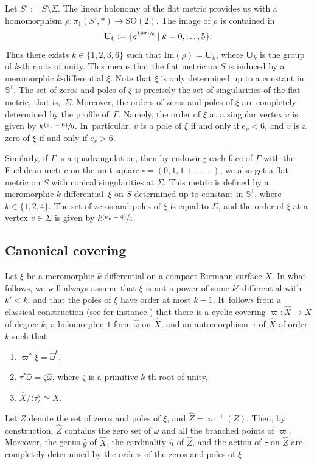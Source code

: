 \documentclass[JEP,XML,SOM,Unicode]{cedram}
\newenvironment{enumeratea}
{\bgroup\def\theenumi{\alph{enumi}}\begin{enumerate}}
{\end{enumerate}\egroup}
\newcommand{\psfrac}[2]{\sfrac{(#1)}{#2}}
\theoremstyle{plain}
\theoremstyle{definition}
\renewcommand{\S}{\mathbb{S}}
\newcommand{\Ub}{\mathbf{U}}
\let\Sig\Sigma
\let\G\Gamma
\begin{document}
Let $S':=S\setminus\Sigma$. The linear holonomy of the flat metric provides us with a homomorphism $\rho: \pi_1(S',*) \to \mathrm{SO}(2)$.
The image of $\rho$ is contained in
\[
\Ub_6:=\{e^{k\sfrac{2\pi\imath}{6}}\mid k=0,\dots,5\}.
\]
Thus there exists $k\in \{1,2,3,6\}$ such that $\mathrm{Im}(\rho)=\Ub_k$, where $\Ub_k$ is the group of $k$-th roots of unity.
This means that the flat metric on $S$ is induced by a meromorphic $k$-differential $\xi$.
Note that $\xi$ is only determined up to a constant in $\S^1$.
The set of zeros and poles of $\xi$ is precisely the set of singularities of the flat metric, that is,~$\Sigma$.
Moreover, the orders of zeros and poles of $\xi$ are completely determined by the profile of~$\G$.
Namely, the order of $\xi$ at a singular vertex $v$ is given by $k\psfrac{e_v-6}{6}$.
In~particular, $v$ is a pole of $\xi$ if and only if $e_v<6$, and $v$ is a zero of $\xi$ if and only if $e_v>6$.

Similarly, if $\G$ is a quadrangulation, then by endowing each face of $\G$ with the Euclidean metric on the unit square $\square=(0,1,1+\imath,\imath)$, we also get a flat metric on $S$ with conical singularities at $\Sig$. This metric is defined by a meromorphic $k$-differential~$\xi$ on $S$ determined up to constant in $\S^1$, where $k\in \{1,2,4\}$. The set of zeros and poles of $\xi$ is equal to $\Sigma$, and the order of $\xi$ at a vertex $v\in \Sigma$ is given by $k\psfrac{e_v-4}{4}$.

\subsection{Canonical covering}\label{sec:can:cov:kdiff}
Let $\xi$ be a meromorphic $k$-differential on a compact Riemann surface $X$. In what follows, we will always assume that $\xi$ is not a power of some $k'$-differential with $k'<k$, and that the poles of $\xi$ have order at most $k-1$. It~follows from a classical construction (see for instance \cite{EV92, BCGGM:kdiff, Ngu19}) that there is a cyclic covering $\varpi: \hat{X}\to X$ of degree $k$, a holomorphic $1$-form $\hat{\omega}$ on $\hat{X}$, and an automorphism~$\tau$ of $\hat{X}$ of order $k$ such that
\begin{enumeratea}
\item\label{enum:a}
$\varpi^*\xi=\hat{\omega}^k$,
\item\label{enum:b}
$\tau^*\hat{\omega}=\zeta\hat{\omega}$, where $\zeta$ is a primitive $k$-th root of unity,
\item\label{enum:c}
$\hat{X}/\langle \tau \rangle \simeq X$.
\end{enumeratea}
Let $Z$ denote the set of zeros and poles of $\xi$, and $\hat{Z}=\varpi^{-1}(Z)$. Then, by construction, $\hat{Z}$ contains the zero set of $\omega$ and all the branched points of $\varpi$.
Moreover, the genus $\hat{g}$ of $\hat{X}$, the cardinality $\hat{n}$ of $\hat{Z}$, and the action of $\tau$ on $\hat{Z}$ are completely determined by the orders of the zeros and poles of $\xi$.
\end{document}

